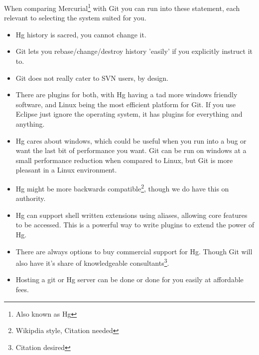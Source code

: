 When comparing Mercurial\footnote{Also known as Hg} with Git you can run into these statement, each relevant to selecting the system suited for you.
\begin{itemize}
\item
Hg history is sacred, you cannot change it.

\item
Git lets you rebase/change/destroy history 'easily' if you explicitly instruct it to.

\item
Git does not really cater to SVN users, by design.

\item
There are plugins for both, with Hg having a tad more windows friendly software, and Linux being the most efficient platform for Git.
If you use Eclipse just ignore the operating system, it has plugins for everything and anything.

\item
Hg cares about windows, which could be useful when you run into a bug or want the last bit of performance you want.
Git can be run on windows at a small performance reduction when compared to Linux, but Git is more pleasant in a Linux environment.

\item
Hg might be more backwards compatible\footnote{Wikipdia style, Citation needed}, though we do have this on authority.

\item
Hg can support shell written extensions using aliases, allowing core features to be accessed. This is a powerful way to write plugins to extend the power of Hg.

\item
There are always options to buy commercial support for Hg.
Though Git will also have it's share of knowledgeable consultants\footnote{Citation desired}.

\item
Hosting a git or Hg server can be done or done for you easily at affordable fees.

\end{itemize}


